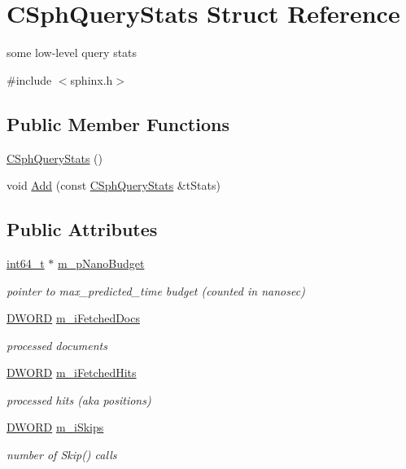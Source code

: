 \hypertarget{structCSphQueryStats}{\section{C\-Sph\-Query\-Stats Struct Reference}
\label{structCSphQueryStats}
}


some low-\/level query stats  




{\ttfamily \#include $<$sphinx.\-h$>$}

\subsection*{Public Member Functions}
\begin{DoxyCompactItemize}
\item 
\hyperlink{structCSphQueryStats_a9a040b732110853ad6cdd31649cecef1}{C\-Sph\-Query\-Stats} ()
\item 
void \hyperlink{structCSphQueryStats_aae9979b38ab3f4d4c2d428f1bedcc1d6}{Add} (const \hyperlink{structCSphQueryStats}{C\-Sph\-Query\-Stats} \&t\-Stats)
\end{DoxyCompactItemize}
\subsection*{Public Attributes}
\begin{DoxyCompactItemize}
\item 
\hyperlink{sphinxstd_8h_a996e72f71b11a5bb8b3b7b6936b1516d}{int64\-\_\-t} $\ast$ \hyperlink{structCSphQueryStats_a834d9a42e0441d58d8a2bb70818c13a8}{m\-\_\-p\-Nano\-Budget}
\begin{DoxyCompactList}\small\item\em pointer to max\-\_\-predicted\-\_\-time budget (counted in nanosec) \end{DoxyCompactList}\item 
\hyperlink{sphinxstd_8h_a798af1e30bc65f319c1a246cecf59e39}{D\-W\-O\-R\-D} \hyperlink{structCSphQueryStats_a76fc139e1c6b9efbc13d51145db0fa09}{m\-\_\-i\-Fetched\-Docs}
\begin{DoxyCompactList}\small\item\em processed documents \end{DoxyCompactList}\item 
\hyperlink{sphinxstd_8h_a798af1e30bc65f319c1a246cecf59e39}{D\-W\-O\-R\-D} \hyperlink{structCSphQueryStats_a097db9dbdd7828bd51397c8346fc9c99}{m\-\_\-i\-Fetched\-Hits}
\begin{DoxyCompactList}\small\item\em processed hits (aka positions) \end{DoxyCompactList}\item 
\hyperlink{sphinxstd_8h_a798af1e30bc65f319c1a246cecf59e39}{D\-W\-O\-R\-D} \hyperlink{structCSphQueryStats_a1ae88398f284f58e6e6fe83319d62f1a}{m\-\_\-i\-Skips}
\begin{DoxyCompactList}\small\item\em number of Skip() calls \end{DoxyCompactList}\end{DoxyCompactItemize}


